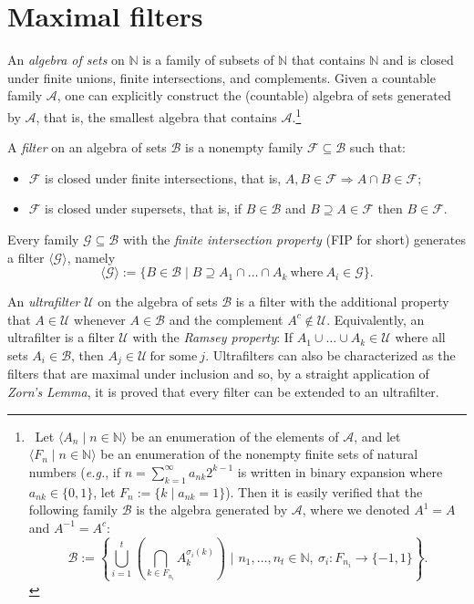 \documentclass[10pt]{amsart}
\theoremstyle{definition}
\theoremstyle{remark}
\def\N{\mathbb{N}}
\def\B{\mathcal{B}}
\def\F{\mathcal{F}}
\def\G{\mathcal{G}}
\def\U{\mathcal{U}}
\begin{document}
\section{Maximal filters}

An \emph{algebra of sets} on $\N$ is a family 
of subsets of $\N$ that contains $\N$ and is closed under
finite unions, finite intersections, and complements.
Given a countable family $\mathcal{A}$,
one can explicitly construct the (countable)
algebra of sets generated by $\mathcal{A}$, that is, 
the smallest algebra that contains $\mathcal{A}$.\footnote
{~Let $\langle A_n\mid n\in\N\rangle$ be an enumeration of the elements of $\mathcal{A}$,
and let $\langle F_n\mid n\in\N\rangle$ be an enumeration 
of the nonempty finite sets of natural numbers
(\emph{e.g.}, if 
$n=\sum_{k=1}^\infty{a_{nk}}{2^{k-1}}$ is written
in binary expansion
where $a_{nk}\in\{0,1\}$, let $F_n:=\{k\mid a_{nk}=1\}$).
Then it is easily verified that
the following family $\B$ is the algebra generated by $\mathcal{A}$, 
where we denoted $A^{1}=A$ and $A^{-1}=A^c$:
$$\B:=\left\{
\bigcup_{i=1}^t(\bigcap_{k\in F_{n_i}}A_k^{\sigma_i(k)})\,\,\Big|\,\,
n_1,\ldots,n_t\in\N,\ \sigma_i:F_{n_i}\to\{-1,1\}\right\}.$$}

A \emph{filter} on an algebra of sets $\mathcal{B}$
is a nonempty family $\F\subseteq\mathcal{B}$ such that:
\begin {itemize}
\item
$\F$ is closed under finite intersections, that is, 
$A,B\in\F\Rightarrow A\cap B\in\F$;
\item
$\F$ is closed under supersets, that is, 
if $B\in\mathcal{B}$ and $B\supseteq A\in\F$ then $B\in\F$.
\end{itemize}

Every family $\G\subseteq\mathcal{B}$
with the \emph{finite intersection property} (FIP for short) 
generates a filter $\langle\G\rangle$, namely 
$$\langle\G\rangle:=
\{B\in\mathcal{B}\mid B\supseteq A_1\cap\ldots\cap A_k\ \text{where}\ 
A_i\in\G\}.$$


An \emph{ultrafilter} $\U$ on the algebra of sets $\B$ is a filter with the additional 
property that $A\in\U$ whenever $A\in\B$ and the complement $A^c\notin\U$.
Equivalently, an ultrafilter is a filter $\U$ 
with the \emph{Ramsey property}:
If $A_1\cup\ldots\cup A_k\in\U$ where all sets $A_i\in\B$,
then $A_j\in\U\ \text{for some}\ j$.
Ultrafilters can also be characterized as the filters
that are maximal under inclusion and so, by a straight
application of \emph{Zorn's Lemma}, 
it is proved that every filter can be extended to an ultrafilter.
\end{document}
